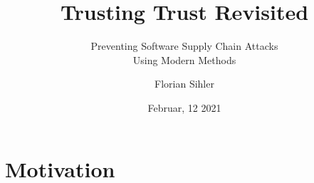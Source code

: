 



\title{Trusting Trust Revisited}
\subtitle{Preventing Software Supply Chain Attacks\hfill\\Using Modern Methods}

\author{Florian Sihler}

\date{Februar, 12 2021}



\section{Motivation}

\begin{frame}{\space}
    \pause{}\begin{layout-imageonly}
\end{layout-imageonly}
\end{frame}

\def\tblockfont#1{#1}
\tblocksize=0.95cm
\def\boostrapping{%
\begin{t-diagram}[tborder/.append style={draw=none,fill=lgray,rounded corners=4pt}]
    \begin{scope}[tborder/.append style={fill=hl-shade}]
        \onslide<2->{\tblock[g]{\tblocksize*8+4*\tblockoffset,2*\tblocksize+2*\tblockoffset}{\SL{}}{\ML{}}{\ML{}}}
    \end{scope}
    \begin{scope}[tborder/.append style={densely dashed}]
    \onslide<3->{\tblock[b]{2*\tblocksize+\tblockoffset,-\tblocksize-\tblockoffset}{T}{\ML{}}{\ML{}}}
        \onslide<5->{\tblock[c]{\tblocksize*4+\tblockoffset*2,0}{\SL0}{\ML{}}{\ML{}}}
        \onslide<7->{\tblock[f]{\tblocksize*6+3*\tblockoffset,\tblocksize+\tblockoffset}{\SL1}{\ML{}}{\ML{}}}
    \end{scope}
    \onslide<4->{\tblock[a]{0,0}{\SL0}{\ML{}}{T}}
    \onslide<6->{\tblock[d]{\tblocksize*2+\tblockoffset,\tblocksize+\tblockoffset}{\SL1}{\ML{}}{\SL0}}
    \onslide<8->{\tblock[e]{\tblocksize*4+2*\tblockoffset,2*\tblocksize+2*\tblockoffset}{\SL{}}{\ML{}}{\SL1}}
\end{t-diagram}
}


